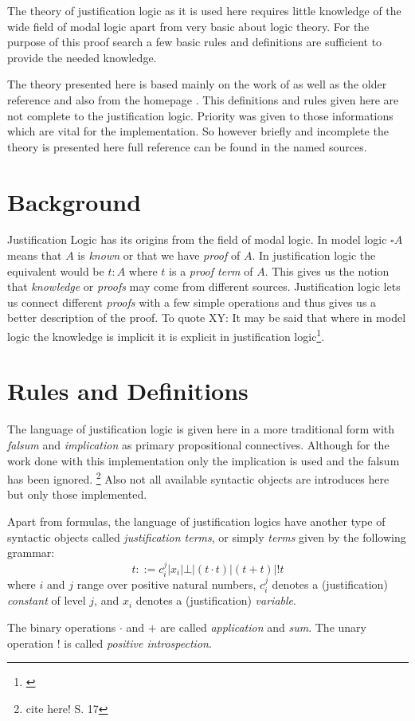The theory of justification logic as it is used here requires little knowledge of the wide field of modal logic apart from very basic about logic theory. For the purpose of this proof search a few basic rules and definitions are sufficient to provide the needed knowledge. 

 The theory presented here is based mainly on the work of \cite{goet} as well as the older reference \cite{art} and also from the homepage \cite{stan}. This definitions and rules given here are not complete to the justification logic. Priority was given to those informations which are vital for the implementation. So however briefly and incomplete the theory is presented here full reference can be found in the named sources. 

\section{Background}
Justification Logic has its origins from the field of modal logic. 
In model logic $\square A$ means that $A$ is \emph{known} or that we have \emph{proof} of $A$. In justification logic the equivalent would be $t:A$ where $t$ is a \emph{proof term} of $A$. This gives us the notion that \emph{knowledge} or \emph{proofs} may come from different sources. Justification logic lets us connect different \emph{proofs} with a few simple operations and thus gives us a better description of the proof. To quote XY: It may be said that where in model logic the knowledge is implicit it is explicit in justification logic\footnote{\cite{goet}}.

\section{Rules and Definitions}

The language of justification logic is given here in a more traditional form with \emph{falsum} and \emph{implication} as primary propositional connectives. Although for the work done with this implementation only the implication is used and the falsum has been ignored. \footnote{cite here! S. 17} Also not all available syntactic objects are introduces here but only those implemented.

\begin{definition}\label{justification_terms} Apart from formulas, the language of justification logics have another type of syntactic objects called \emph{justification terms}, or simply \emph{terms} given by the following grammar:
\[
	t::= c_{i}^{j} | x_i | \bot | (t \cdot t) | (t+t) | !t
\]
where $i$ and $j$ range over positive natural numbers, $c_{i}^{j}$ denotes a (justification) \emph{constant} of level $j$, and $x_i$ denotes a (justification) \emph{variable}.

The binary operations $\cdot$ and $+$ are called \emph{application} and \emph{sum}. The unary operation $!$ is called \emph{positive introspection}.
\end{definition}

